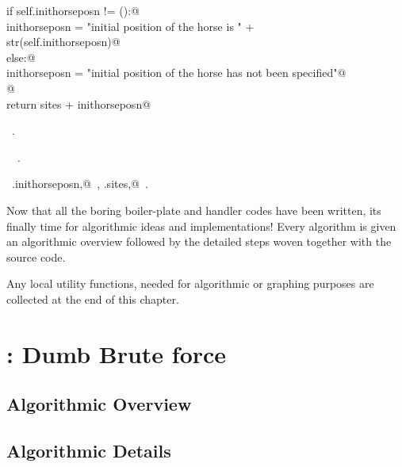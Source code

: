 \documentclass[11.5pt]{report}
\begin{document}
\begin{flushleft}
\begin{list}{}{}
\mbox{}\verb@          if self.inithorseposn != ():@\\
\mbox{}\verb@              inithorseposn = "\nThe initial position of the horse is " + \@\\
\mbox{}\verb@                               str(self.inithorseposn)@\\
\mbox{}\verb@          else:@\\
\mbox{}\verb@              inithorseposn = "\nThe initial position of the horse has not been specified"@\\
\mbox{}\verb@              @\\
\mbox{}\verb@          return sites + inithorseposn@\\
\mbox{}\verb@@{\NWsep}
\end{list}
\vspace{-1.5ex}
\footnotesize
\begin{list}{}{\setlength{\itemsep}{-\parsep}\setlength{\itemindent}{-\leftmargin}}
\item \NWtxtMacroRefIn\ .
\item \NWtxtIdentsDefed\nobreak\  \verb@HorseFlyInput@\nobreak\ .\item \NWtxtIdentsUsed\nobreak\  \verb@self.inithorseposn,@\nobreak\ , \verb@self.sites,@\nobreak\ .
\item{}
\end{list}
\vspace{4ex}
\end{flushleft}
Now that all the boring boiler-plate and handler codes have been 
written, its finally time for algorithmic ideas and implementations! 
Every algorithm is given an algorithmic overview followed by the 
detailed steps woven together with the source code. 

Any local utility functions, needed for algorithmic or graphing purposes 
are collected at the end of this chapter. 

\newpage

\section{: Dumb Brute force}

\subsection{Algorithmic Overview}

\subsection{Algorithmic Details}
\end{document}

